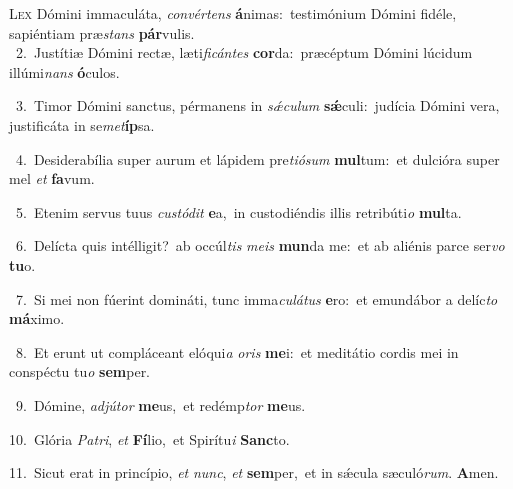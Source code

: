 \lettrine{\initial\textcolor{\initialcolor}{L}}{ex} Dómini immaculáta, \textit{con}\-\textit{vér}\textit{tens} \textbf{á}\-nimas:~\star testimónium Dómini fidéle, sapiéntiam præ\textit{stans} \textbf{pár}\-vulis.\\
{\numbfont\textcolor{\numbcolor}{~2.}}~Justítiæ Dómini rectæ, læti\-\textit{fi}\-\textit{cán}\textit{tes} \textbf{cor}\-da:~\star præcéptum Dómini lúcidum illúmi\textit{nans} \textbf{ó}\-culos.\par
{\numbfont\textcolor{\numbcolor}{~3.}}~Timor Dómini sanctus, pérmanens in \textit{sǽ}\-\textit{cu}\textit{lum} \textbf{sǽ}\-culi:~\star judícia Dómini vera, justificáta in se\-\textit{met}\-\textbf{íp}sa.\par
{\numbfont\textcolor{\numbcolor}{~4.}}~Desiderabília super aurum et lápidem pre\-\textit{ti}\-\textit{ó}\textit{sum} \textbf{mul}\-tum:~\star et dulcióra super mel \textit{et} \textbf{fa}\-vum.\par
{\numbfont\textcolor{\numbcolor}{~5.}}~Etenim servus tuus \textit{cus}\-\textit{tó}\textit{dit} \textbf{e}\-a,~\star in custodiéndis illis retribúti\textit{o} \textbf{mul}\-ta.\par
{\numbfont\textcolor{\numbcolor}{~6.}}~Delícta quis intélligit?~\dagger ab occúl\textit{tis} \textit{me}\-\textit{is} \textbf{mun}\-da me:~\star et ab aliénis parce ser\textit{vo} \textbf{tu}\-o.\par
{\numbfont\textcolor{\numbcolor}{~7.}}~Si mei non fúerint domináti, tunc imma\-\textit{cu}\-\textit{lá}\textit{tus} \textbf{e}\-ro:~\star et emundábor a delíc\textit{to} \textbf{má}\-ximo.\par
{\numbfont\textcolor{\numbcolor}{~8.}}~Et erunt ut compláceant elóqui\textit{a} \textit{o}\-\textit{ris} \textbf{me}\-i:~\star et meditátio cordis mei in conspéctu tu\textit{o} \textbf{sem}\-per.\par
{\numbfont\textcolor{\numbcolor}{~9.}}~Dómine, \textit{ad}\-\textit{jú}\textit{tor} \textbf{me}\-us,~\star et redémp\textit{tor} \textbf{me}\-us.\par
{\numbfont\textcolor{\numbcolor}{10.}}~Glória \textit{Pa}\-\textit{tri}, \textit{et} \textbf{Fí}\-lio,~\star et Spirítu\textit{i} \textbf{Sanc}\-to.\par
{\numbfont\textcolor{\numbcolor}{11.}}~Sicut erat in princípio, \textit{et} \textit{nunc}\-, \textit{et} \textbf{sem}\-per,~\star et in sǽcula sæculó\-\textit{rum}\-. \textbf{A}\-men.\par
